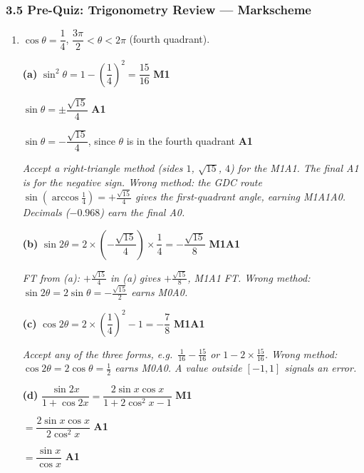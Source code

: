 \documentclass[12pt, twoside]{article}
\begin{document}
\subsubsection*{3.5 Pre-Quiz: Trigonometry Review --- Markscheme}

\begin{enumerate}[itemsep=0.1cm]

\item[1.] [Maximum mark: 11]

$\cos\theta = \dfrac{1}{4}$, \quad $\dfrac{3\pi}{2} < \theta < 2\pi$ (fourth
quadrant).

\textbf{(a)} $\sin^{2}\theta = 1 - \left(\dfrac{1}{4}\right)^{2}
= \dfrac{15}{16}$ \hfill \textbf{M1}

$\sin\theta = \pm\dfrac{\sqrt{15}}{4}$ \hfill \textbf{A1}

$\sin\theta = -\dfrac{\sqrt{15}}{4}$, since $\theta$ is in the fourth
quadrant \hfill \textbf{A1}

\emph{Accept a right-triangle method (sides $1$, $\sqrt{15}$, $4$) for the
M1A1. The final A1 is for the negative sign. Wrong method: the GDC route
$\sin\left(\arccos\frac{1}{4}\right) = +\frac{\sqrt{15}}{4}$ gives the
first-quadrant angle, earning M1A1A0. Decimals ($-0.968$) earn the final
A0.}

\textbf{(b)} $\sin 2\theta = 2 \times \left(-\dfrac{\sqrt{15}}{4}\right)
\times \dfrac{1}{4} = -\dfrac{\sqrt{15}}{8}$ \hfill \textbf{M1A1}

\emph{FT from (a): $+\frac{\sqrt{15}}{4}$ in (a) gives $+\frac{\sqrt{15}}{8}$,
M1A1 FT. Wrong method: $\sin 2\theta = 2\sin\theta = -\frac{\sqrt{15}}{2}$
earns M0A0.}

\textbf{(c)} $\cos 2\theta = 2 \times \left(\dfrac{1}{4}\right)^{2} - 1
= -\dfrac{7}{8}$ \hfill \textbf{M1A1}

\emph{Accept any of the three forms, e.g.\ $\frac{1}{16} - \frac{15}{16}$
or $1 - 2 \times \frac{15}{16}$. Wrong method: $\cos 2\theta = 2\cos\theta
= \frac{1}{2}$ earns M0A0. A value outside $[-1, 1]$ signals an error.}

\textbf{(d)} $\dfrac{\sin 2x}{1 + \cos 2x}
= \dfrac{2\sin x\cos x}{1 + 2\cos^{2}x - 1}$ \hfill \textbf{M1}

$= \dfrac{2\sin x\cos x}{2\cos^{2}x}$ \hfill \textbf{A1}

$= \dfrac{\sin x}{\cos x}$ \hfill \textbf{A1}


\end{enumerate}
\end{document}
